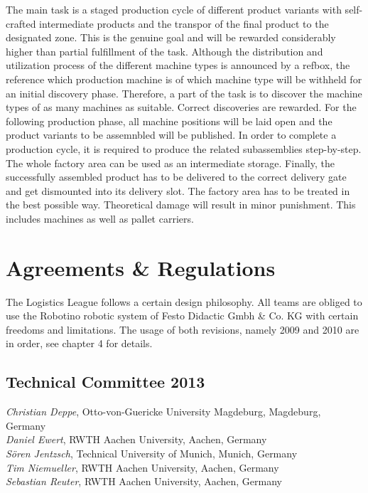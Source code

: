 \documentclass[12pt,twoside]{article}
\begin{document}
The main task is a staged production cycle of different product
variants with self-crafted intermediate products and the transpor  of
the final product to the designated zone. This is the genuine goal and
will be rewarded considerably higher than partial fulfillment of the
task. Although the distribution and utilization process of the
different machine types is announced by a refbox, the reference which
production machine is of which machine type will be withheld for an
initial discovery phase. Therefore, a part of the task is to discover
the machine types of as many machines as suitable. Correct discoveries
are rewarded. For the following production phase, all machine positions
will be laid open and the product variants to be assemnbled will be
published. In order to complete a production cycle, it is required to
produce the related subassemblies step-by-step. The whole factory area
can be used as an intermediate storage. Finally, the successfully
assembled product has to be delivered to the correct delivery gate and
get dismounted into its delivery slot. The factory area has to be
treated in the best possible way. Theoretical damage will result in
minor punishment. This includes machines as well as pallet carriers.

\section{Agreements \& Regulations}

The Logistics League follows a certain design philosophy. All teams
are obliged to use the Robotino robotic system of Festo Didactic Gmbh
\& Co. KG with certain freedoms and limitations. The usage of both
revisions, namely 2009 and 2010 are in order, see chapter 4 for
details.

\subsection*{Technical Committee 2013}
\emph{Christian Deppe}, Otto-von-Guericke University Magdeburg, Magdeburg,
Germany\\
\emph{Daniel Ewert}, RWTH Aachen University, Aachen, Germany\\
\emph{S\"oren Jentzsch}, Technical University of Munich, Munich, Germany\\
\emph{Tim Niemueller}, RWTH Aachen University, Aachen, Germany\\
\emph{Sebastian Reuter}, RWTH Aachen University, Aachen, Germany
\end{document}
